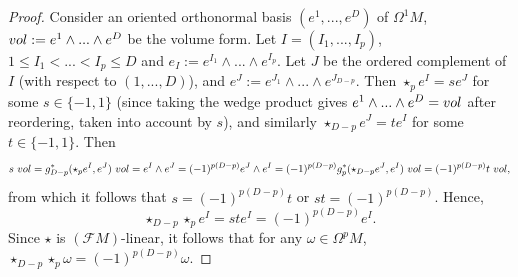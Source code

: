 \documentclass[10pt,a4paper]{amsart}
\newcommand{\vol}{\mathop{\rm vol}\nolimits}
\begin{document}
\begin{proof}
  Consider an oriented orthonormal basis $(e^1, ..., e^D)$ of $\Omega^1 M$, $\vol := e^1 \wedge ... \wedge e^D$ be the volume form.
  Let $I = (I_1, ..., I_p)$, $1 \leq I_1 < ... < I_p \leq D$ and $e_I := e^{I_1} \wedge ... \wedge e^{I_p}$.
  Let $J$ be the ordered complement of $I$ (with respect to $(1, ..., D)$),
  and $e^J := e^{J_1} \wedge ... \wedge e^{J_{D - p}}$.
  Then $\star_p e^I = s e^J$ for some $s \in \{-1, 1\}$ (since taking the wedge product gives $e^1 \wedge ... \wedge e^D = \vol$ after reordering, taken into account by $s$), and similarly $\star_{D - p} e^J = t e^I$ for some $t \in \{-1, 1\}$.
  Then
  \begin{equation}
    s\, \vol
    = g^*_{D - p}(\star_p e^I, e^J)\, \vol = e^I \wedge e^J
    = (-1)^{p (D - p)} e^J \wedge e^I
    = (-1)^{p (D - p)} g^*_p(\star_{D - p} e^J, e^I)\, \vol
    = (-1)^{p (D - p)} t\, \vol,
  \end{equation}
  from which it follows that $s = (-1)^{p (D - p)} t$ or $s t = (-1)^{p (D - p)}$.
  Hence,
  \begin{equation}
    \star_{D - p} \star_p e^I = s t e^I = (-1)^{p (D - p)} e^I.
  \end{equation}
  Since $\star$ is $(\mathcal{F} M)$-linear, it follows that for any $\omega \in \Omega^p M$,
  $\star_{D - p} \star_p \omega = (-1)^{p (D - p)} \omega$.
\end{proof}
\end{document}
